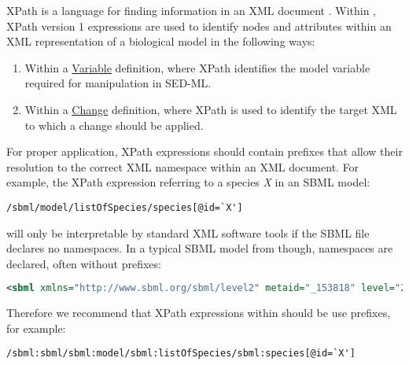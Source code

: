 
\label{sec:xpath} 
XPath is a language for finding information in an XML document \cite{xpath:1999}. Within \LoneVone, XPath version 1 expressions are  used to identify nodes and attributes within an XML representation of a biological model in the following ways:
%
\begin{enumerate}
\item {Within a \hyperref[class:variable]{Variable} definition, where XPath identifies the model variable required for manipulation in SED-ML.}
\item {Within a  \hyperref[class:change]{Change} definition, where XPath is used to identify the target XML to which a change should be applied.} 

\end{enumerate}

For proper application, XPath expressions should contain prefixes that allow their resolution to the correct XML namespace within an XML document. For example, the XPath expression referring to a species \emph{X} in an SBML model:
\begin{verbatim}
/sbml/model/listOfSpecies/species[@id=`X'] 
\end{verbatim}
will only be interpretable by standard XML software tools  if the SBML file declares no namespaces. In a typical SBML  model from \biom though, namespaces are declared, often without prefixes:
\begin{lstlisting}[keywordstyle=\color{blue}\bfseries, stringstyle=\color{blue},language=XML,basicstyle=\ttfamily\scriptsize,xleftmargin=1.5em, xrightmargin=1.5em ]
<sbml xmlns="http://www.sbml.org/sbml/level2" metaid="_153818" level="2" version="1">
\end{lstlisting}

Therefore we recommend that  XPath expressions within  \LoneVone should be use prefixes, for example:

\begin{verbatim}
/sbml:sbml/sbml:model/sbml:listOfSpecies/sbml:species[@id=`X'] 
\end{verbatim}




